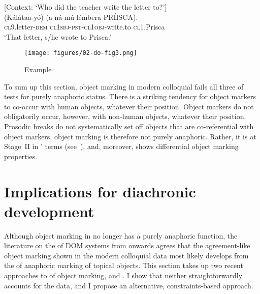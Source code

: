 \documentclass[output=paper]{LSP/langsci}
\begin{document}
{
\begin{exe}
\ex
\label{02-do-ex:31}%
[Context: ‘Who did the teacher write the letter to?’]\\
\gll	(Kálátaa-yó) 	(a-ná-mú-lémbera 			PRÍISCA).\\
\textsc{cl9}.letter-\textsc{dem}	 \textsc{cl1sbj}-\textsc{pst}-\textsc{cl1obj}-write.to		\textsc{cl}1.Prisca\\
\glt ‘That letter, s/he wrote to Prisca.’
\end{exe}
}

\begin{figure}[th]
\texttt{[image: figures/02-do-fig3.png]}
\caption{Example }
\label{fig:3}
\end{figure}
To sum up this section, object marking in modern colloquial 
fails all three of  tests for purely
anaphoric status. There is a striking tendency for object markers to
co-occur with human objects, whatever their position. Object markers
do not obligatorily occur, however, with non-human objects, whatever
their position. Prosodic breaks do not systematically set off objects
that are co-referential with object markers.  object marking
is therefore not purely anaphoric. Rather, it is at Stage~II in
\citet{Creissels2006Typology}' terms (see~), and, moreover, shows differential object marking properties.

\section{Implications for diachronic development}
\label{Downing-Implications}
Although object marking in  no longer has a purely anaphoric
function, the literature on the  of DOM systems
from \citet{Givon1976Topic} onwards agrees that the agreement-like
object marking shown in the modern colloquial  data most
likely develops from the  of anaphoric marking of
topical objects. This section takes up two recent approaches to
 of object marking, \citet{Creissels2006Typology}
and \citet{Dalrympleetal2011Objects}. I show that neither
straightforwardly accounts for the  data, and I propose an
alternative, constraints-based approach.

\largerpage
\end{document}

